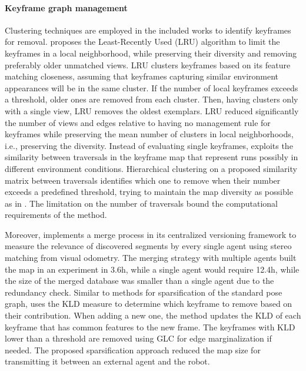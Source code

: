\paragraph{Keyframe graph management}

Clustering techniques are employed in the included works to identify keyframes for removal.
\cite{konolige-bowman:2009:5354121} proposes the Least-Recently Used (LRU) algorithm to limit the keyframes in a local neighborhood, while preserving their diversity and removing preferably older unmatched views. LRU clusters keyframes  based on its feature matching closeness, assuming that keyframes capturing similar environment appearances will be in the same cluster. If the number of local keyframes exceeds a threshold, older ones are removed from each cluster. Then, having clusters only with a single view, LRU removes the oldest exemplars. LRU reduced significantly the number of views and edges relative to having no management rule for keyframes while preserving the mean number of clusters in local neighborhoods, i.e., preserving the diversity.
Instead of evaluating single keyframes, \cite{bouaziz-et-al:2022:4} exploits the similarity between traversals in the keyframe map that represent runs possibly in different environment conditions. Hierarchical clustering on a proposed similarity matrix between traversals identifies which one to remove when their number exceeds a predefined threshold, trying to maintain the map diversity as possible as in \cite{konolige-bowman:2009:5354121}. The limitation on the number of traversals bound the computational requirements of the method.

Moreover, \cite{gadd-newman:2016:7759843} implements a merge process in its centralized versioning framework to measure the relevance of discovered segments by every single agent using stereo matching from visual odometry. The merging strategy with multiple agents built the map in an experiment in 3.6h, while a single agent would require 12.4h, while the size of the merged database was smaller than a single agent due to the redundancy check.
Similar to methods for sparsification of the standard pose graph, \cite{ding-et-al:2019:8968550} uses the KLD measure to determine which keyframe to remove based on their contribution. When adding a new one, the method updates the KLD of each keyframe that has common features to the new frame. The keyframes with KLD lower than a threshold are removed using GLC for edge marginalization if needed. The proposed sparsification approach reduced the map size for transmitting it between an external agent and the robot.

